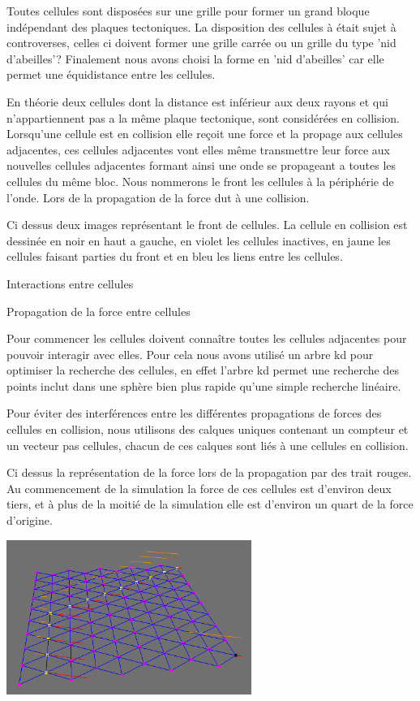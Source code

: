 \documentclass[a4paper,10pt]{article}
\begin{document}
Toutes cellules sont disposées sur une grille pour former un grand bloque indépendant des plaques tectoniques. La disposition des cellules à était sujet à controverses, celles ci doivent former une grille carrée ou un grille du type 'nid d'abeilles'? Finalement nous avons choisi la forme en 'nid d'abeilles' car elle permet une équidistance entre les cellules.

En théorie deux cellules dont la distance est inférieur aux deux rayons et qui n'appartiennent pas a la même plaque tectonique, sont considérées en collision. Lorsqu'une cellule est en collision elle reçoit  une force et la propage aux cellules adjacentes, ces cellules adjacentes vont elles même transmettre leur force aux nouvelles cellules adjacentes formant ainsi une onde se propageant a toutes les cellules du même bloc.
Nous nommerons le front les cellules à la périphérie de l'onde. Lors de la propagation de la force dut à une collision.




Ci dessus deux images représentant le front de cellules. La cellule en collision est dessinée en noir en haut a gauche, en violet les cellules inactives, en jaune les cellules faisant parties du front et en bleu les liens entre les cellules.

Interactions entre cellules

	Propagation de la force entre cellules

Pour commencer les cellules doivent connaître toutes les cellules adjacentes pour pouvoir interagir avec elles. Pour cela nous avons utilisé un arbre kd pour optimiser la recherche des cellules, en effet l'arbre kd permet une recherche des points inclut dans une sphère bien plus rapide qu'une simple recherche linéaire.

Pour éviter des interférences entre  les différentes propagations de forces des cellules en collision, nous utilisons des calques uniques contenant un compteur et un vecteur pas cellules, chacun de ces calques sont liés à une cellules en collision.



Ci dessus la représentation de la force lors de la propagation par des trait rouges. Au commencement de la simulation la force de ces cellules est d'environ deux tiers, et à plus de la moitié de la simulation elle est d'environ un quart de la force d'origine.

\begin{center}
  \includegraphics[width=8cm]{screen_calque1.png}
\end{center}
\end{document}
